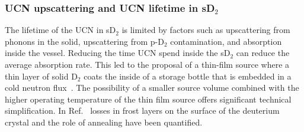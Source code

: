 


\subsubsection{UCN upscattering and UCN lifetime in sD$_2$}





The lifetime of the UCN in sD$_2$ is limited by factors such as
upscattering from phonons in the solid, upscattering from p-D$_2$
contamination, and absorption inside the vessel.  Reducing the time
UCN spend inside the sD$_2$ can reduce the average absorption
rate. This led to the proposal of a thin-film source where a thin
layer of solid D$_2$ coats the inside of a storage bottle that is
embedded in a cold neutron flux~\cite{Golub83}. The possibility of a
smaller source volume combined with the higher operating temperature
of the thin film source offers significant technical
simplification. In Ref.~\cite{anghel2018solid} losses in frost layers
on the surface of the deuterium crystal and the role of annealing have
been quantified.

